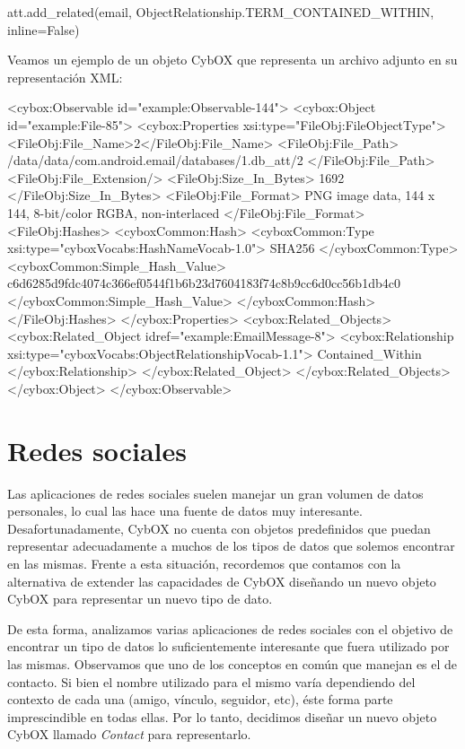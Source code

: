 \begin{python}
att.add_related(email,
             ObjectRelationship.TERM_CONTAINED_WITHIN, 
             inline=False)
\end{python}

Veamos un ejemplo de un objeto CybOX que representa un archivo adjunto en su representación XML:
\newline

\begin{xml}
<cybox:Observable id="example:Observable-144">
  <cybox:Object id="example:File-85">
    <cybox:Properties xsi:type="FileObj:FileObjectType">
      <FileObj:File_Name>2</FileObj:File_Name>
      <FileObj:File_Path>
/data/data/com.android.email/databases/1.db_att/2
      </FileObj:File_Path>
      <FileObj:File_Extension/>
      <FileObj:Size_In_Bytes>
        1692
      </FileObj:Size_In_Bytes>
      <FileObj:File_Format>
        PNG image data, 144 x 144, 
        8-bit/color RGBA, non-interlaced
      </FileObj:File_Format>
      <FileObj:Hashes>
        <cyboxCommon:Hash>
          <cyboxCommon:Type xsi:type="cyboxVocabs:HashNameVocab-1.0">
            SHA256
          </cyboxCommon:Type>
          <cyboxCommon:Simple_Hash_Value>
c6d6285d9fdc4074c366ef0544f1b6b23d7604183f74c8b9cc6d0cc56b1db4c0
          </cyboxCommon:Simple_Hash_Value>
        </cyboxCommon:Hash>
      </FileObj:Hashes>
    </cybox:Properties>
    <cybox:Related_Objects>
      <cybox:Related_Object idref="example:EmailMessage-8">
        <cybox:Relationship xsi:type="cyboxVocabs:ObjectRelationshipVocab-1.1">
          Contained_Within
        </cybox:Relationship>
      </cybox:Related_Object>
    </cybox:Related_Objects>
  </cybox:Object>
</cybox:Observable>
\end{xml}

\section{Redes sociales} \label{RedesSociales}
Las aplicaciones de redes sociales suelen manejar un gran volumen de datos personales, lo cual las hace una fuente de datos muy interesante. Desafortunadamente, CybOX no cuenta con objetos predefinidos que puedan representar adecuadamente a muchos de los tipos de datos que solemos encontrar en las mismas. Frente a esta situación, recordemos que contamos con la alternativa de extender las capacidades de CybOX diseñando un nuevo objeto CybOX para representar un nuevo tipo de dato.

De esta forma, analizamos varias aplicaciones de redes sociales con el objetivo de encontrar un tipo de datos lo suficientemente interesante que fuera utilizado por las mismas. Observamos que uno de los conceptos en común que manejan es el de contacto. Si bien el nombre utilizado para el mismo varía dependiendo del contexto de cada una (amigo, vínculo, seguidor, etc), éste forma parte imprescindible en todas ellas. Por lo tanto, decidimos diseñar un nuevo objeto CybOX llamado \emph{Contact} para representarlo.

